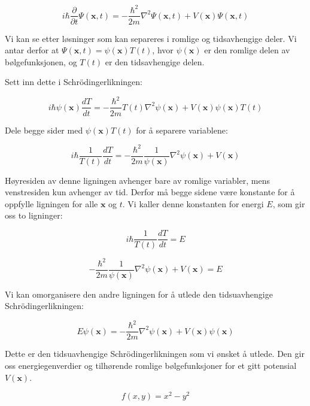 \begin{equation*}
i\hbar\frac{\partial}{\partial t}\Psi(\mathbf{x},t) = -\frac{\hbar^2}{2m}\nabla^2\Psi(\mathbf{x},t) + V(\mathbf{x})\Psi(\mathbf{x},t)
\end{equation*}

Vi kan se etter løsninger som kan separeres i romlige og tidsavhengige deler. Vi antar derfor at $\Psi(\mathbf{x},t) = \psi(\mathbf{x})T(t)$, hvor $\psi(\mathbf{x})$ er den romlige delen av bølgefunksjonen, og $T(t)$ er den tidsavhengige delen.

Sett inn dette i Schrödingerlikningen:

\begin{equation*}
i\hbar \psi(\mathbf{x})\frac{dT}{dt} = -\frac{\hbar^2}{2m}T(t)\nabla^2\psi(\mathbf{x}) + V(\mathbf{x})\psi(\mathbf{x})T(t)
\end{equation*}

Dele begge sider med $\psi(\mathbf{x})T(t)$ for å separere variablene:

\begin{equation*}
i\hbar\frac{1}{T(t)}\frac{dT}{dt} = -\frac{\hbar^2}{2m}\frac{1}{\psi(\mathbf{x})}\nabla^2\psi(\mathbf{x}) + V(\mathbf{x})
\end{equation*}

Høyresiden av denne ligningen avhenger bare av romlige variabler, mens venstresiden kun avhenger av tid. Derfor må begge sidene være konstante for å oppfylle ligningen for alle $\mathbf{x}$ og $t$. Vi kaller denne konstanten for energi $E$, som gir oss to ligninger:

\begin{equation*}
i\hbar\frac{1}{T(t)}\frac{dT}{dt} = E
\end{equation*}

\begin{equation*}
-\frac{\hbar^2}{2m}\frac{1}{\psi(\mathbf{x})}\nabla^2\psi(\mathbf{x}) + V(\mathbf{x}) = E
\end{equation*}

Vi kan omorganisere den andre ligningen for å utlede den tidsuavhengige Schrödingerlikningen:

\begin{equation*}
E \psi(\mathbf{x})=-\frac{\hbar^{2}}{2 m} \nabla^2 \psi(\mathbf{x})+V(\mathbf{x})\psi(\mathbf{x})
\end{equation*}

Dette er den tidsuavhengige Schrödingerlikningen som vi ønsket å utlede. Den gir oss energiegenverdier og tilhørende romlige bølgefunksjoner for et gitt potensial $V(\mathbf{x})$.



\begin{equation*}
    f(x,y)=x^2-y^2
\end{equation*}